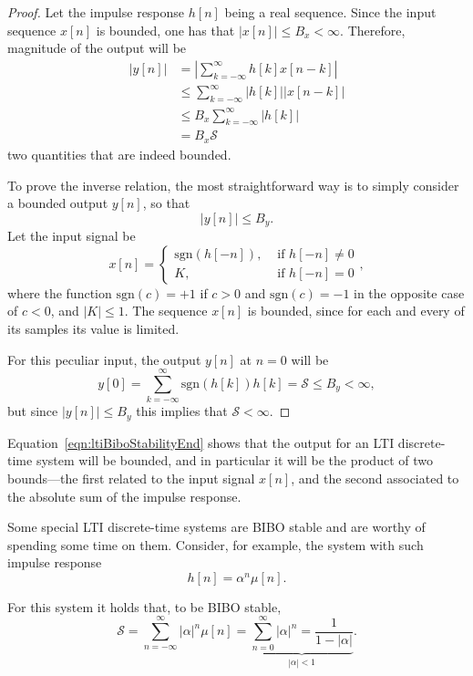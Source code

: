 \documentclass[\documentfontsize, twocolumn]{\classname}
\begin{document}
\begin{proof}
    Let the impulse response $h[n]$ being a real sequence. Since the input sequence $x[n]$ is bounded, one has that $|x[n]| \leq B_x < \infty$. Therefore, magnitude of the output will be 
    \begin{align}
        |y[n]| &= \left| \sum_{k=-\infty}^\infty h[k]x[n-k]\right| \\
               &\leq \sum_{k=-\infty}^\infty |h[k]||x[n-k]| \\
               &\leq B_x \sum_{k=-\infty}^\infty |h[k]| \\
               & = B_x \mathcal S\label{eqn:ltiBiboStabilityEnd}
    \end{align}
    two quantities that are indeed bounded.

    To prove the inverse relation, the most straightforward way is to simply consider a bounded output $y[n]$, so that \[|y[n]| \leq B_y.\] Let the input signal be 
\[
    x[n] = \left\{ \begin{array}{lc} \mbox{sgn} (h[-n]), & \mbox{ if } h[-n] \neq 0 \\ K, & \mbox{ if } h[-n] = 0\end{array}\right.,
\]
where the function $\mbox{sgn}(c) = +1$ if $c > 0$ and $\mbox{sgn}(c) = -1$ in the opposite case of $c<0$, and $|K| \leq 1$. The sequence $x[n]$ is bounded, since for each and every of its samples its value is limited.

For this peculiar input, the output $y[n]$ at $n=0$ will be 
\[
    y[0] = \sum_{k=-\infty}^\infty \mbox{sgn}(h[k])h[k] = \mathcal S \leq B_y < \infty,
\]
but since $|y[n]| \leq B_y$ this implies that $\mathcal S < \infty$.
\end{proof}

Equation~\ref{eqn:ltiBiboStabilityEnd} shows that the output for an LTI discrete-time system will be bounded, and in particular it will be the product of two bounds---the first related to the input signal $x[n]$, and the second associated to the absolute sum of the impulse response.

Some special LTI discrete-time systems are BIBO stable and are worthy of spending some time on them. Consider, for example, the system with such impulse response \[h[n] = \alpha^n \mu[n].\]

For this system it holds that, to be BIBO stable,
\[
    \mathcal S = \sum_{n=-\infty}^\infty |\alpha|^n \mu[n] = \underbrace{\sum_{n=0}^\infty |\alpha|^n =\frac{1}{1-|\alpha|}}_{|\alpha| < 1} .
\]
\end{document}

